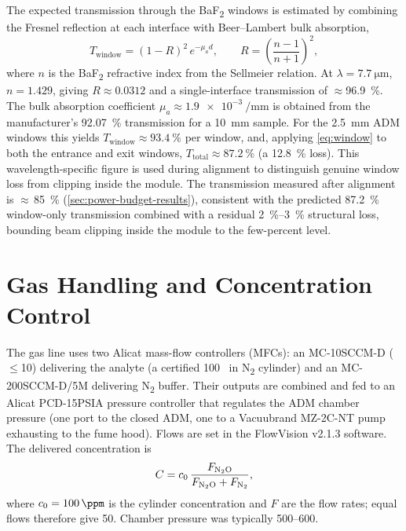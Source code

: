 The expected transmission through the BaF\textsubscript{2} windows is estimated
by combining the Fresnel reflection at each interface with Beer--Lambert bulk
absorption,
\begin{equation}
  \label{eq:window}
  T_\text{window} = (1-R)^2 \, e^{-\mu_a d},
  \qquad
  R = \left(\frac{n-1}{n+1}\right)^2 ,
\end{equation}
where $n$ is the BaF\textsubscript{2} refractive index from the Sellmeier
relation. At $\lambda = \SI{7.7}{\micro\meter}$, $n = 1.429$, giving
$R \approx 0.0312$ and a single-interface transmission of \(\approx\)\SI{96.9}{\percent}.
The bulk absorption coefficient $\mu_a \approx \SI{1.9e-3}{\per\milli\meter}$ is
obtained from the manufacturer's \SI{92.07}{\percent} transmission for a
\SI{10}{\milli\meter} sample. For the \SI{2.5}{\milli\meter} ADM windows this
yields $T_\text{window} \approx \SI{93.4}{\percent}$ per window, and, applying
\cref{eq:window} to both the entrance and exit windows,
$T_\text{total} \approx \SI{87.2}{\percent}$ (a \SI{12.8}{\percent} loss). This
wavelength-specific figure is used during alignment to distinguish genuine window
loss from clipping inside the module. The transmission measured after alignment
is $\approx$\,\SI{85}{\percent} (\cref{sec:power-budget-results}), consistent
with the predicted \SI{87.2}{\percent} window-only transmission combined with a
residual \SIrange{2}{3}{\percent} structural loss, bounding beam clipping inside
the module to the few-percent level.

\section{Gas Handling and Concentration Control}
\label{sec:gas}

The gas line uses two Alicat mass-flow controllers (MFCs): an MC-10SCCM-D
(\(\le\)\SI{10}{\sccm}) delivering the analyte (a certified \SI{100}{\ppm} \nto\
in N\textsubscript{2} cylinder) and an MC-200SCCM-D/5M delivering N\textsubscript{2}
buffer. Their outputs are combined and fed to an Alicat PCD-15PSIA pressure
controller that regulates the ADM chamber pressure (one port to the closed ADM,
one to a Vacuubrand MZ-2C-NT pump exhausting to the fume hood). Flows are set in
the FlowVision v2.1.3 software. The delivered concentration is
\begin{equation}
  \label{eq:conc}
  C = c_0 \, \frac{F_\text{N\textsubscript{2}O}}{F_\text{N\textsubscript{2}O} + F_{\mathrm{N_2}}},
\end{equation}
where $c_0 = \SI{100}{\ppm}$ is the cylinder concentration and $F$ are the flow
rates; equal flows therefore give \SI{50}{\ppm}. Chamber pressure was typically
\SIrange{500}{600}{\torr}.
